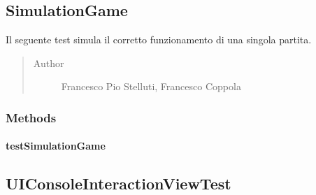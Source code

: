 \documentclass[letterpaper,10pt,italian]{sphinxmanual}
\begin{document}
\subsection{SimulationGame}
\label{\detokenize{test/it/unicam/cs/pa/mastermind/test/SimulationGame:simulationgame}}\label{\detokenize{test/it/unicam/cs/pa/mastermind/test/SimulationGame::doc}}

\begin{fulllineitems}
\label{\detokenize{test/it/unicam/cs/pa/mastermind/test/SimulationGame:it.unicam.cs.pa.mastermind.test.SimulationGame}}
Il seguente test simula il corretto funzionamento di una singola partita.
\begin{quote}\begin{description}
\item[{Author}] \leavevmode
Francesco Pio Stelluti, Francesco Coppola

\end{description}\end{quote}

\end{fulllineitems}



\subsubsection{Methods}
\label{\detokenize{test/it/unicam/cs/pa/mastermind/test/SimulationGame:methods}}

\paragraph{testSimulationGame}
\label{\detokenize{test/it/unicam/cs/pa/mastermind/test/SimulationGame:testsimulationgame}}

\begin{fulllineitems}
\label{\detokenize{test/it/unicam/cs/pa/mastermind/test/SimulationGame:it.unicam.cs.pa.mastermind.test.SimulationGame.testSimulationGame()}}
\end{fulllineitems}



\subsection{UIConsoleInteractionViewTest}
\label{\detokenize{test/it/unicam/cs/pa/mastermind/test/UIConsoleInteractionViewTest:uiconsoleinteractionviewtest}}\label{\detokenize{test/it/unicam/cs/pa/mastermind/test/UIConsoleInteractionViewTest::doc}}
\end{document}
